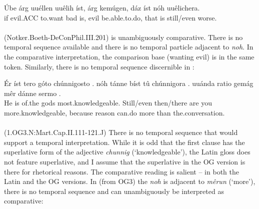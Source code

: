 \documentclass[output=paper
,modfonts
,nonflat]{langsci/langscibook}
\begin{document}
\ea\gll Úbe árg uuéllen uuêlih íst, árg kemúgen, dáz íst nóh uuêlichera.\\
       if evil.ACC to.want bad is, evil be.able.to.do, that is still/even worse.\\%
\label{OG3_noch_schlimmer} \\  (Notker.Boeth-DeConPhil.III.201)
\z
{} is unambiguously comparative. There is no temporal sequence available and there is no temporal particle adjacent to \textit{noh}. In the comparative interpretation, the comparison base (wanting evil) is in the same token. Similarly, there is no temporal sequence discernible in :

\ea\gll Ér íst tero góto {chúnnigosto .} nóh tánne bíst tû {chúnnigora .} uuánda ratio gemág mêr dánne {sermo .}\\
       He is of.the gods most.knowledgeable. Still/even then/there are you more.knowledgeable, because reason can.do more than the.conversation.\\
\label{OG3_noch_wissend} \\ (1.OG3.N:Mart.Cap.II.111-121.J)
\z
There is no temporal sequence that would support a temporal interpretation. While it is odd that the first clause has the superlative form of the adjective \textit{chunnig} (`knowledgeable'), the Latin gloss does not feature superlative, and I assume that the superlative in the OG version is there for rhetorical reasons. The comparative reading is salient -- in both the Latin and the OG versions. In  (from OG3) the \textit{noh} is adjacent to \textit{mêrun} (`more'), there is no temporal sequence and  can unambiguously be interpreted as comparative:
\end{document}
